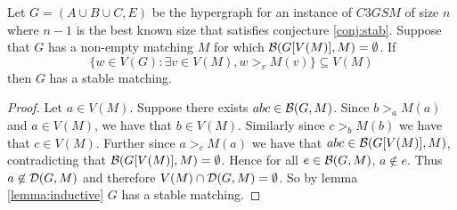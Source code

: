 \begin{lemma}\label{lemma:partialstab}
Let $G = (A\cup B \cup C, E)$ be the hypergraph for an instance of $C3GSM$ of size $n$ where $n-1$ is the best known size that  satisfies conjecture \ref{conj:stab}. Suppose that $G$ has a non-empty matching $M$ for which $\mathcal{B}(G[V(M)],M) = \emptyset$. If $$\{w \in V(G): \exists v \in V(M), w >_v M(v)\} \subseteq V(M)$$ then $G$ has a stable matching.
\end{lemma}
\begin{proof}
Let $a \in V(M)$. Suppose there exists $abc \in \mathcal{B}(G,M)$. Since $b >_a M(a)$ and $a \in V(M)$, we have that $b \in V(M)$. Similarly since $c >_b M(b)$ we have that $c \in V(M)$. Further since $a >_c M(a)$ we have that $abc \in \mathcal{B}(G[V(M)],M)$, contradicting that $\mathcal{B}(G[V(M)],M) = \emptyset$. Hence for all $e \in \mathcal{B}(G,M)$, $a \not\in e$. Thus $a\not \in \mathcal{D}(G,M)$ and therefore $V(M) \cap \mathcal{D}(G,M) = \emptyset$. So by lemma \ref{lemma:inductive} $G$ has a stable matching.
\end{proof}
